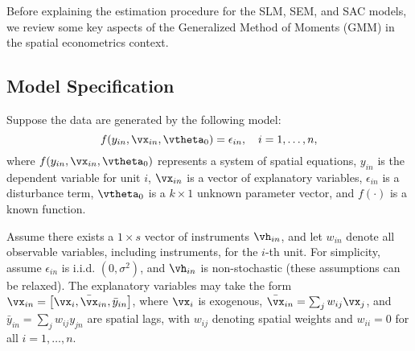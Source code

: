 Before explaining the estimation procedure for the SLM, SEM, and SAC models, we review some key aspects of the Generalized Method of Moments (GMM) in the spatial econometrics context.

\subsection{Model Specification}

Suppose the data are generated by the following model:
\begin{equation*}
f(y_{in}, \vx_{in}, \vtheta_0) = \epsilon_{in}, \quad i = 1, \ldots, n,
\end{equation*}
%
where $f(y_{in}, \vx_{in}, \vtheta_0)$ represents a system of spatial equations, $y_{in}$ is the dependent variable for unit $i$, $\vx_{in}$ is a vector of explanatory variables, $\epsilon_{in}$ is a disturbance term, $\vtheta_0$ is a $k \times 1$ unknown parameter vector, and $f(\cdot)$ is a known function.

Assume there exists a $1 \times s$ vector of instruments $\vh_{in}$, and let $w_{in}$ denote all observable variables, including instruments, for the $i$-th unit. For simplicity, assume $\epsilon_{in}$ is i.i.d. $(0, \sigma^2)$, and $\vh_{in}$ is non-stochastic (these assumptions can be relaxed). The explanatory variables may take the form $\vx_{in} = \left[ \vx_i, \bar{\vx}_{in}, \bar{y}_{in} \right]$, where $\vx_i$ is exogenous, $\bar{\vx}_{in} = \sum_j w_{ij} \vx_j$, and  $\bar{y}_{in} = \sum_j w_{ij} y_{jn}$ are spatial lags, with $w_{ij}$ denoting spatial weights and $w_{ii} = 0$ for all $i = 1, \ldots, n$.


